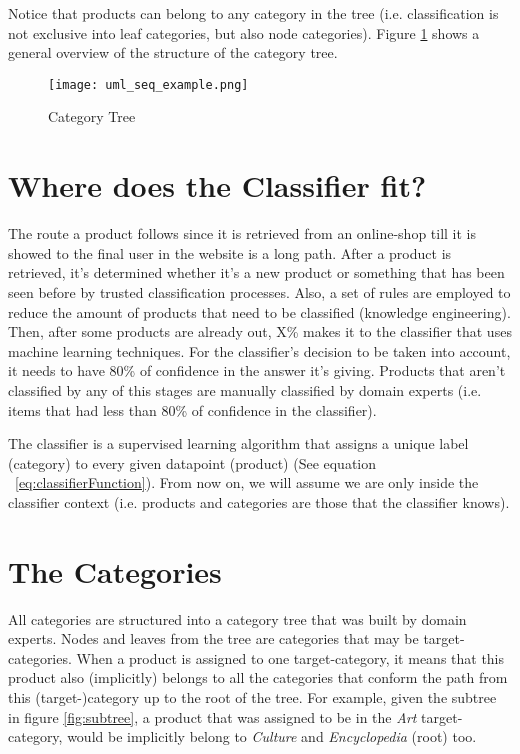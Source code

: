 Notice that products can belong to any category in the tree (i.e. classification is not exclusive into leaf categories, but also node categories). Figure \ref{fig:idealoTree} shows a general overview of the structure of the category tree.

\begin{figure}[!htbp]
  \centering
  \texttt{[image: uml\_seq\_example.png]}\\
  \caption{Category Tree}
  \label{fig:idealoTree}
\end{figure}


\section{Where does the Classifier fit?\label{sec:classifier}}
The route a product follows since it is retrieved from an online-shop till it is showed to the final user in the website is a long path. After a product is retrieved, it's determined whether it's a new product or something that has been seen before by trusted classification processes. Also, a set of rules are employed to reduce the amount of products that need to be classified (knowledge engineering). Then, after some products are already out, X\% makes it to the classifier that uses machine learning techniques. 
For the classifier's decision to be taken into account, it needs to have 80\% of confidence in the answer it's giving.
Products that aren't classified by any of this stages are manually classified by domain experts (i.e. items that had less than 80\% of confidence in the classifier).

The classifier is a supervised learning algorithm that assigns a unique label (category) to every given datapoint (product) (See equation ~\ref{eq:classifierFunction}). From now on, we will assume we are only inside the classifier context (i.e. products and categories are those that the classifier knows).

\section{The Categories \label{sec:conceptsubb}}

All categories are structured into a category tree that was built by domain experts. Nodes and leaves from the tree are categories that may be target-categories. 
When a product is assigned to one target-category, it means that this product also (implicitly) belongs to all the categories that conform the path from this (target-)category up to the root of the tree. For example, given the subtree in figure \ref{fig:subtree}, a product that was assigned to be in the \textit{Art} target-category, would be implicitly  belong to \textit{Culture} and \textit{Encyclopedia} (root) too.

